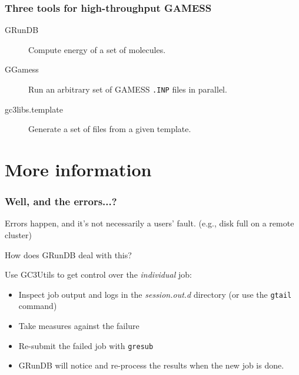 \documentclass {beamer}
\newcommand{\largeskip}{\vspace{1em}}
\def\+{\largeskip}
\begin{document}
\begin{frame}
  \frametitle{Three tools for high-throughput GAMESS}

  \begin{description}
  \item[GRunDB] Compute energy of a set of molecules.
  \item[GGamess] Run an arbitrary set of GAMESS \texttt{.INP} files in parallel.
  \item[gc3libs.template] Generate a set of files from a given template.
  \end{description}
\end{frame}


\section{More information}

\begin{frame}
  \frametitle{Well, and the errors...?}

  Errors happen, and it's not necessarily a users' fault.  (e.g., disk
  full on a remote cluster)

  \+ How does GRunDB deal with this?

  \pause
  \+ Use GC3Utils to get control over the \emph{individual} job:
  \begin{itemize}
  \item Inspect job output and logs in the \emph{session.out.d}
    directory (or use the \texttt{gtail} command)
  \item Take measures against the failure
  \item Re-submit the failed job with \texttt{gresub}
  \item GRunDB will notice and re-process the results when the new job
    is done.    
  \end{itemize}

\end{frame}
\end{document}

